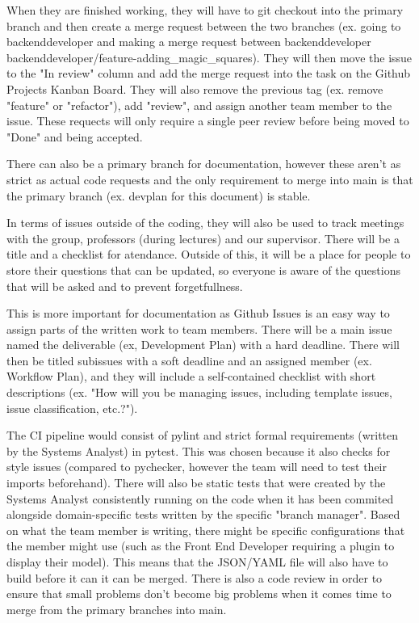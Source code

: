 \documentclass{article}
\begin{document}
When they are finished working, they will have to git checkout into the primary branch and then create a merge request between the two branches (ex. going to backenddeveloper and making a merge request between backenddeveloper backenddeveloper/feature-adding\_magic\_squares).
They will then move the issue to the "In review" column and add the merge request into the task on the Github Projects Kanban Board. They will also remove the previous tag (ex. remove "feature" or "refactor"), add "review", and assign another team member to the issue. These requects will only require a single peer review before being moved to "Done" and being accepted.

There can also be a primary branch for documentation, however these aren't as strict as actual code requests and the only requirement to merge into main is that the primary branch (ex. devplan for this document) is stable. 


In terms of issues outside of the coding, they will also be used to track meetings with the group, professors (during lectures) and our supervisor. There will be a title and a checklist for atendance. Outside of this, it will be a place for people to store their questions that can be updated, so everyone is aware of the questions that will be asked and to prevent forgetfullness.

This is more important for documentation as Github Issues is an easy way to assign parts of the written work to team members. There will be a main issue named the deliverable (ex, Development Plan) with a hard deadline. There will then be titled subissues with a soft deadline and an assigned member (ex. Workflow Plan), and they will include a self-contained checklist with short descriptions (ex. "How will you be managing issues, including template issues, issue
classification, etc.?"). 

The CI pipeline would consist of pylint and strict formal requirements (written by the Systems Analyst) in pytest. This was chosen because it also checks for style issues (compared to pychecker, however the team will need to test their imports beforehand). There will also be static tests that were created by the Systems Analyst consistently running on the code when it has been commited alongside domain-specific tests written by the specific "branch manager".
Based on what the team member is writing, there might be specific configurations that the member might use (such as the Front End Developer requiring a plugin to display their model). This means that the JSON/YAML file will also have to build before it can it can be merged. There is also a code review in order to ensure that small problems don't become big problems when it comes time to merge from the primary branches into main.
\end{document}
